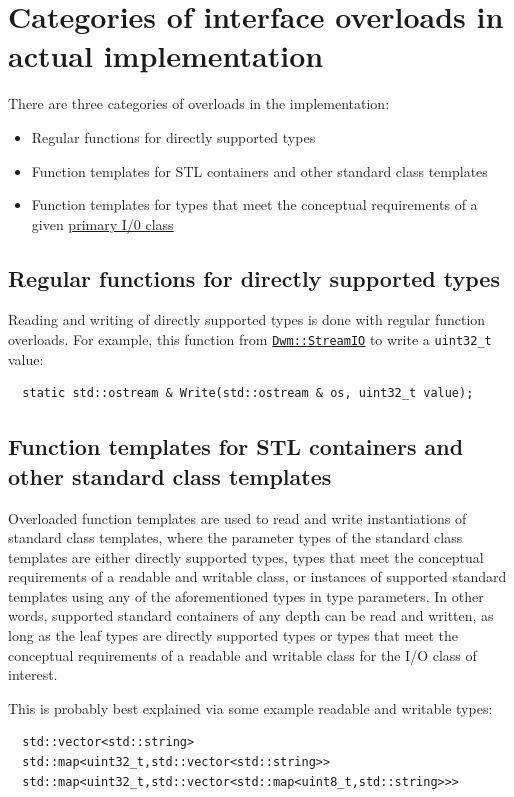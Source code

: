 \section{Categories of interface overloads in actual implementation}
There are three categories of overloads in the implementation:
\begin{itemize}[noitemsep,nolistsep]
\item Regular functions for directly supported types
\item Function templates for STL containers and other standard class
  templates
\item Function templates for types that meet the conceptual requirements
  of a given \hyperref[chapter:primaryIOClasses]{primary I/0 class}
\end{itemize}

\subsection{Regular functions for directly supported types}
Reading and writing of directly supported types is done with regular
function overloads.  For example, this function from
\hyperref[section:DwmStreamIOClass]{\texttt{Dwm::StreamIO}}
to write a \texttt{uint32\_t} value:
\begin{verbatim}
  static std::ostream & Write(std::ostream & os, uint32_t value);
\end{verbatim}

\subsection{Function templates for STL containers and other standard class templates}
Overloaded function templates are used to read and write instantiations of
standard class templates, where the parameter types of the standard
class templates are either directly supported types, types that meet
the conceptual requirements of a readable and writable class, or instances
of supported standard templates using any of the aforementioned types in
type parameters.  In other words, supported standard containers of any depth
can be read and written, as long as the leaf types are directly
supported types or types that meet the conceptual requirements of a
readable and writable class for the I/O class of interest.

This is probably best explained via some example readable and writable
types:
\begin{verbatim}
  std::vector<std::string>
  std::map<uint32_t,std::vector<std::string>>
  std::map<uint32_t,std::vector<std::map<uint8_t,std::string>>>
\end{verbatim}

